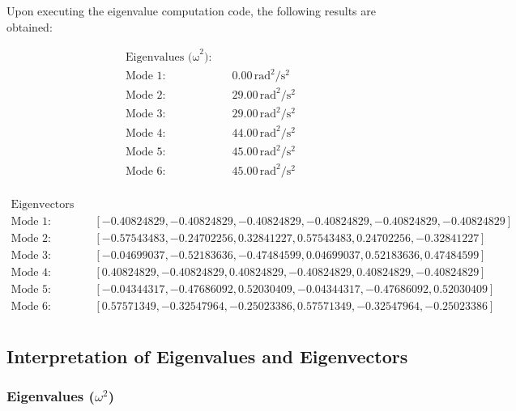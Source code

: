 \documentclass[12pt]{report} %
\begin{document}
Upon executing the eigenvalue computation code, the following results are obtained:

\[
\begin{aligned}
\text{Eigenvalues (ω}^2\text{):} \\
\text{Mode 1}: & \quad 0.00 \, \text{rad}^2/\text{s}^2 \\
\text{Mode 2}: & \quad 29.00 \, \text{rad}^2/\text{s}^2 \\
\text{Mode 3}: & \quad 29.00 \, \text{rad}^2/\text{s}^2 \\
\text{Mode 4}: & \quad 44.00 \, \text{rad}^2/\text{s}^2 \\
\text{Mode 5}: & \quad 45.00 \, \text{rad}^2/\text{s}^2 \\
\text{Mode 6}: & \quad 45.00 \, \text{rad}^2/\text{s}^2 \\
\end{aligned}
\]

\[
\begin{aligned}
\text{Eigenvectors (Normal Modes):} \\
\text{Mode 1}: & \quad [-0.40824829, -0.40824829, -0.40824829, -0.40824829, -0.40824829, -0.40824829] \\
\text{Mode 2}: & \quad [-0.57543483, -0.24702256,  0.32841227,  0.57543483,  0.24702256, -0.32841227] \\
\text{Mode 3}: & \quad [-0.04699037, -0.52183636, -0.47484599,  0.04699037,  0.52183636,  0.47484599] \\
\text{Mode 4}: & \quad [ 0.40824829, -0.40824829,  0.40824829, -0.40824829,  0.40824829, -0.40824829] \\
\text{Mode 5}: & \quad [-0.04344317, -0.47686092,  0.52030409, -0.04344317, -0.47686092,  0.52030409] \\
\text{Mode 6}: & \quad [ 0.57571349, -0.32547964, -0.25023386,  0.57571349, -0.32547964, -0.25023386] \\
\end{aligned}
\]

\subsection{Interpretation of Eigenvalues and Eigenvectors}
\label{subsec:part2_task2_interpretation}

\subsubsection{Eigenvalues (\( \omega^2 \))}
\label{subsubsec:part2_task2_eigenvalues}
\end{document}
